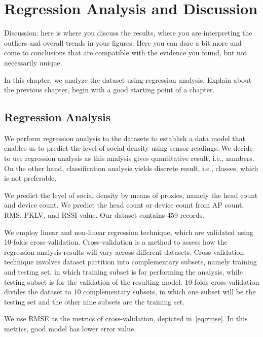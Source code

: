 \chapter{Regression Analysis and Discussion}
\label{ch:regression-and-discussion} %
Discussion: here is where you discuss the results, where you are interpreting the outliers and overall trends in your figures. Here you can dare a bit more and come to conclusions that are compatible with the evidence you found, but not necessarily unique. 

In this chapter, we analyze the dataset using regression analysis.
Explain about the previous chapter, begin with a good starting point of a chapter.



\section{Regression Analysis} %
\label{sec:regression_analysis}
We perform regression analysis to the datasets to establish a data model that enables us to predict the level of social density using sensor readings. We decide to use regression analysis as this analysis gives quantitative result, i.e., numbers. On the other hand, classification analysis yields discrete result, i.e., classes, which is not preferable.

We predict the level of social density by means of proxies, namely the head count and device count. We predict the head count or device count from \ac{AP} count, \ac{RMS}, \ac{PKLV}, and \ac{RSSI} value. Our dataset contains 459 records.

We employ linear and non-linear regression technique, which are validated using 10-folds cross-validation. Cross-validation is a method to assess how the regression analysis results will vary across different datasets. Cross-validation technique involves dataset partition into complementary subsets, namely training and testing set, in which training subset is for performing the analysis, while testing subset is for the validation of the resulting model. 10-folds cross-validation divides the dataset to 10 complementary subsets, in which one subset will be the testing set and the other nine subsets are the training set.

We use \ac{RMSE} as the metrics of cross-validation, depicted in~\autoref{eq:rmse}. In this metrics, good model has lower error value. 

